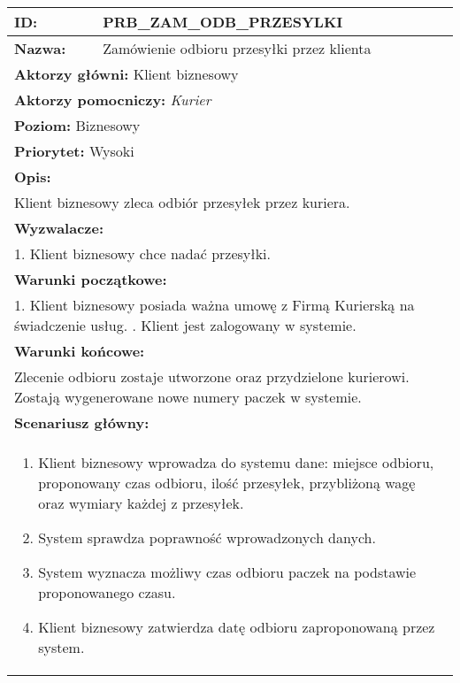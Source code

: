 \begin{center}
\begin{longtable}[h]{|p{1.6cm}|p{13.5cm}|}
\hline
\textbf{ID:} & PRB\_ZAM\_ODB\_PRZESYLKI \\ \hline
\textbf{Nazwa:} & Zamówienie odbioru przesyłki przez klienta \\ \hline
\multicolumn{2}{|p{15.1cm}|}{\textbf{Aktorzy główni:}  Klient biznesowy} \\
\multicolumn{2}{|p{15.1cm}|}{\textbf{Aktorzy pomocniczy:}  \textit{Kurier}} \\
\multicolumn{2}{|p{15.1cm}|}{\textbf{Poziom:}  Biznesowy} \\
\multicolumn{2}{|p{15.1cm}|}{\textbf{Priorytet:}  Wysoki} \\
\hline
\multicolumn{2}{|p{15.1cm}|}{\textbf{Opis:}} \\
\multicolumn{2}{|p{15.1cm}|}{Klient biznesowy zleca odbiór przesyłek przez kuriera.
} \\ \hline
\multicolumn{2}{|p{15.1cm}|}{\textbf{Wyzwalacze:}} \\
\multicolumn{2}{|p{15.1cm}|}{1. Klient biznesowy chce nadać przesyłki.
} \\ \hline
\multicolumn{2}{|p{15.1cm}|}{\textbf{Warunki początkowe:}} \\
\multicolumn{2}{|p{15.1cm}|}{
1. Klient biznesowy posiada ważna umowę z Firmą Kurierską na świadczenie usług. \newline
2. Klient jest zalogowany w systemie.
} \\ \hline
\multicolumn{2}{|p{15.1cm}|}{\textbf{Warunki końcowe:}} \\
\multicolumn{2}{|p{15.1cm}|}{
Zlecenie odbioru zostaje utworzone oraz przydzielone kurierowi. Zostają wygenerowane nowe numery paczek w systemie.
} \\ \hline
\multicolumn{2}{|p{15.1cm}|}{\textbf{Scenariusz główny:}} \\
\multicolumn{2}{|p{15.1cm}|}{
\begin{enumerate}
\item Klient biznesowy wprowadza do systemu dane: miejsce odbioru, proponowany czas odbioru, ilość przesyłek, przybliżoną wagę oraz wymiary każdej z przesyłek. \label{sce:wpr_dan}
\item System sprawdza poprawność wprowadzonych danych.
\item System wyznacza możliwy czas odbioru paczek na podstawie proponowanego czasu. \label{sce:wyzn_czas}
\item Klient biznesowy zatwierdza datę odbioru zaproponowaną przez system.

\end{enumerate}}
\end{longtable}
\end{center}
